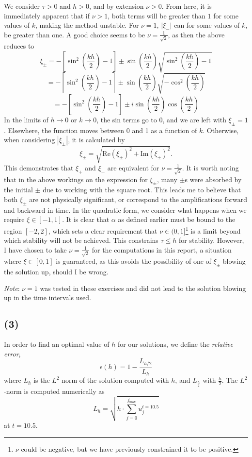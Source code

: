 \documentclass[10pt]{article}
\begin{document}
We consider $\tau >0$ and $h>0$, and by extension $\nu>0$.
From here, it is immediately apparent that if $\nu >1$, both terms will be greater
than $1$ for some values of $k$, making the method unstable.
For $\nu = 1$, $|\xi_-|$ can for some values of $k$, be greater than one.
A good choice seems to be $\nu = \frac{1}{\sqrt{2}}$, as then the above reduces to
$$\xi_\pm = -\left[\sin^2\left(\frac{kh}{2}\right) - 1 \right] \pm \sin\left(\frac{kh}{2}\right)
\sqrt{\sin^2\left(\frac{kh}{2}\right) -1}$$
$$= -\left[\sin^2\left(\frac{kh}{2}\right) - 1 \right] \pm \sin\left(\frac{kh}{2}\right)
\sqrt{-\cos^2\left(\frac{kh}{2}\right)}$$
$$= -\left[\sin^2\left(\frac{kh}{2}\right) - 1 \right] \pm i\sin\left(\frac{kh}{2}\right)
\cos\left(\frac{kh}{2}\right)$$
In the limits of $h \to 0$ or $k \to 0$, the sin terms go to 0, and we are left with
$\xi_\pm = 1$. Elsewhere, the function moves between 0 and 1 as a function of $k$.
Otherwise, when considering $|\xi_\pm|$, it is calculated by
$$ \xi_\pm = \sqrt{\text{Re}\left(\xi_\pm\right)^2 + \text{Im}\left(\xi_\pm\right)^2}.$$
This demonstrates that $\xi_+$ and $\xi_-$ are equivalent for $\nu=\frac{1}{\sqrt{2}}$.
It is worth noting that in
the above workings on the expression for $\xi_\pm$, many $\pm$s were absorbed by the
initial $\pm$ due to working with the square root. This leads me to believe that both
$\xi_\pm$ are not physically significant, or correspond to the amplifications forward
and backward in time.
In the quadratic form, we consider what happens when we require $\xi \in [-1,1]$.
It is clear that $\alpha$ as defined earlier must be bound to the region $[-2,2]$,
which sets a clear requirement that $\nu \in (0,1]$\footnote{$\nu$ could be negative, but
we have previously constrained it to be positive.}
is a limit beyond which stability will not be achieved. This constrains
$\tau \le h$ for stability.
However, I have chosen to take $\nu = \frac{1}{\sqrt{2}}$
for the computations in this report, a situation where $\xi \in [0,1]$ is guaranteed,
as this avoids the possibility of one of $\xi_\pm$ blowing the solution up, should I be wrong.

{\it Note}: $\nu = 1$ was tested in these exercises and did not lead to the solution
blowing up in the time intervals used.

\clearpage
\subsection*{(3)}
In order to find an optimal value of $h$ for our solutions, we define the {\it relative
error},
\begin{equation}
\epsilon (h) = 1 - \frac{L_{h/2}}{L_h}
\label{e:err}
\end{equation}
where $L_h$ is the $L^2$-norm of the solution computed with $h$, and $L_\frac{h}{2}$ with
$\frac{h}{2}$.
The $L^2$-norm is computed numerically as
\begin{equation}
L_h  = \sqrt{h\cdot \sum_{j=0}^{j_\text{max}} u_{j}^{t=10.5}}
\label{e:l2}
\end{equation}
at $t=10.5$.
\end{document}
